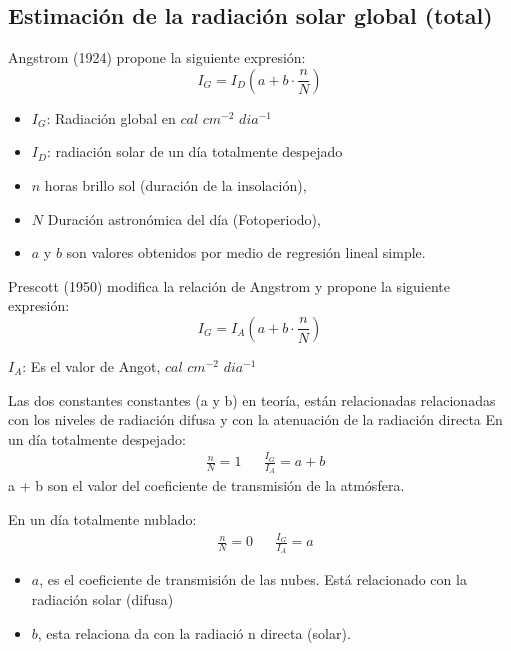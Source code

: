 \subsection{Estimación de la radiación solar global (total)}
Angstrom (1924) propone la siguiente expresión:
\begin{equation}
    I_G = I_D\left(a + b \cdot \frac{n}{N} \right)
\end{equation}
\begin{notation}
\begin{itemize}
    \item $I_G$: Radiación global en $cal$ $cm^{-2}$ $dia^{-1}$
    \item $I_D$: radiación solar de un día totalmente despejado
    \item $n$ horas brillo sol (duración de la insolación),
    \item $N$ Duración astronómica del día (Fotoperiodo),
    \item $a$ y $b$ son valores obtenidos por medio de regresión lineal simple.
\end{itemize}
\end{notation}
Prescott (1950) modifica la relación de Angstrom y propone la siguiente expresión:
\begin{equation}
    I_G = I_A\left(a + b \cdot \frac{n}{N} \right)
\end{equation}
\begin{notation}
$I_A$: Es el valor de Angot, $cal$ $cm^{-2}$ $dia^{-1}$
\end{notation}
Las dos constantes constantes (a y b) en teoría, están relacionadas relacionadas con los niveles de radiación difusa y con la atenuación de la radiación directa
En un día totalmente despejado:
\begin{align*}
    &\frac{n}{N} =1&& \frac{I_G}{I_A} = a + b
\end{align*}
a + b son el valor del coeficiente de transmisión de la atmósfera.

En un día totalmente nublado:
\begin{align*}
    &\frac{n}{N} =0&& \frac{I_G}{I_A} =a
\end{align*}

\begin{notation}
\begin{itemize}
    \item $a$, es el coeficiente de transmisión de las nubes. Está relacionado con la radiación solar (difusa)
    \item $b$, esta relaciona da con la radiació n directa (solar).
\end{itemize}
\end{notation}
